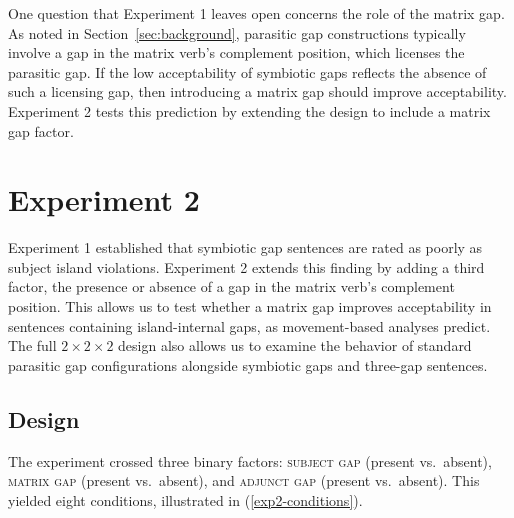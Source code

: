 \documentclass[12pt]{article}
\begin{document}
One question that Experiment 1 leaves open concerns the role of the matrix gap. As noted in Section~\ref{sec:background}, parasitic gap constructions typically involve a gap in the matrix verb's complement position, which licenses the parasitic gap. If the low acceptability of symbiotic gaps reflects the absence of such a licensing gap, then introducing a matrix gap should improve acceptability. Experiment 2 tests this prediction by extending the design to include a matrix gap factor.


\section{Experiment 2}\label{sec:experiment2}

Experiment 1 established that symbiotic gap sentences are rated as poorly as subject island violations. Experiment 2 extends this finding by adding a third factor, the presence or absence of a gap in the matrix verb's complement position. This allows us to test whether a matrix gap improves acceptability in sentences containing island-internal gaps, as movement-based analyses predict. The full $2 \times 2 \times 2$ design also allows us to examine the behavior of standard parasitic gap configurations alongside symbiotic gaps and three-gap sentences.

\subsection{Design}\label{sec:exp2-design}

The experiment crossed three binary factors: \textsc{subject gap} (present vs.\ absent), \textsc{matrix gap} (present vs.\ absent), and \textsc{adjunct gap} (present vs.\ absent). This yielded eight conditions, illustrated in (\ref{exp2-conditions}).
\end{document}
